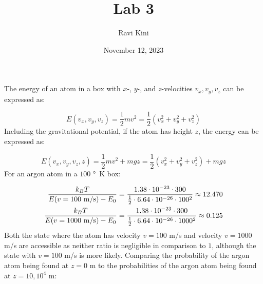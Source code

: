 \documentclass{article}
\title{Lab 3}
\author{Ravi Kini}
\date{November 12, 2023}
\begin{document}
\maketitle


\problem
The energy of an atom in a box with $x$-, $y$-, and $z$-velocities $v_x, v_y, v_z$ can be expressed as:

\begin{equation}
    E(v_x, v_y, v_z) = \frac{1}{2}mv^2 = \frac{1}{2}(v_x^2 + v_y^2 + v_z^2)
\end{equation}
Including the gravitational potential, if the atom has height $z$, the energy can be expressed as:

\begin{equation}
    E(v_x, v_y, v_z, z) = \frac{1}{2}mv^2 + mgz = \frac{1}{2}(v_x^2 + v_y^2 + v_z^2) + mgz
\end{equation}
For an argon atom in a $100$ \unit[per-mode = symbol]{\degree\kelvin} box:

\begin{equation}
    \begin{split}
        \frac{k_B T}{E(v = 100~\unit[per-mode = symbol]{\meter\per\second}) - E_0} & = \frac{1.38 \cdot 10^{-23} \cdot 300}{\frac{1}{2} \cdot 6.64 \cdot 10^{-26} \cdot 100^2} \approx 12.470 \\
        \frac{k_B T}{E(v = 1000~\unit[per-mode = symbol]{\meter\per\second}) - E_0} & = \frac{1.38 \cdot 10^{-23} \cdot 300}{\frac{1}{2} \cdot 6.64 \cdot 10^{-26} \cdot 1000^2} \approx 0.125
    \end{split}
\end{equation} 
Both the state where the atom has velocity $v = 100$ \unit[per-mode = symbol]{\meter\per\second} and velocity $v = 1000$ \unit[per-mode = symbol]{\meter\per\second} are accessible as neither ratio is negligible in comparison to $1$, although the state with $v = 100$ \unit[per-mode = symbol]{\meter\per\second} is more likely. Comparing the probability of the argon atom being found at $z = 0$ \unit[per-mode = symbol]{\meter} to the probabilities of the argon atom being found at $z = 10, 10^4$ \unit[per-mode = symbol]{\meter}:
\end{document}
